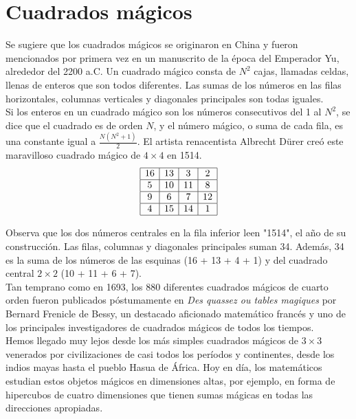 \section*{Cuadrados mágicos}

\noindent Se sugiere que los cuadrados mágicos se originaron en China y fueron mencionados por primera vez en un manuscrito de la época del Emperador Yu, alrededor del 2200 a.C. Un cuadrado mágico consta de $N^2$ cajas, llamadas celdas, llenas de enteros que son todos diferentes. Las sumas de los números en las filas horizontales, columnas verticales y diagonales principales son todas iguales. \\

\noindent Si los enteros en un cuadrado mágico son los números consecutivos del 1 al $N^2$, se dice que el cuadrado es de orden $N$, y el número mágico, o suma de cada fila, es una constante igual a $\frac{N(N^2 + 1)}{2}$. El artista renacentista Albrecht Dürer creó este maravilloso cuadrado mágico de $4 \times 4$ en 1514. \\

\[
\begin{array}{|c|c|c|c|}
\hline
16 & 13 & 3 & 2 \\
\hline
5 & 10 & 11 & 8 \\
\hline
9 & 6 & 7 & 12 \\
\hline
4 & 15 & 14 & 1 \\
\hline
\end{array}
\]

\noindent Observa que los dos números centrales en la fila inferior leen "1514", el año de su construcción. Las filas, columnas y diagonales principales suman 34. Además, 34 es la suma de los números de las esquinas (16 + 13 + 4 + 1) y del cuadrado central $2 \times 2$ (10 + 11 + 6 + 7). \\

\noindent Tan temprano como en 1693, los 880 diferentes cuadrados mágicos de cuarto orden fueron publicados póstumamente en \textit{Des quassez ou tables magiques} por Bernard Frenicle de Bessy, un destacado aficionado matemático francés y uno de los principales investigadores de cuadrados mágicos de todos los tiempos. \\

\noindent Hemos llegado muy lejos desde los más simples cuadrados mágicos de $3 \times 3$ venerados por civilizaciones de casi todos los períodos y continentes, desde los indios mayas hasta el pueblo Hasua de África. Hoy en día, los matemáticos estudian estos objetos mágicos en dimensiones altas, por ejemplo, en forma de hipercubos de cuatro dimensiones que tienen sumas mágicas en todas las direcciones apropiadas.
